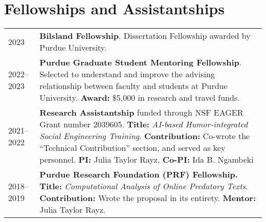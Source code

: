 \documentclass[11pt]{article}
\begin{document}
\section*{Fellowships and Assistantships}
\vspace{-.5em}
\renewcommand*{\arraystretch}{1.5}
\begin{tabularx}{\textwidth}{@{}p{} X}
2023 & \textbf{Bilsland Fellowship}. Dissertation Fellowship awarded by Purdue University.\\
2022--2023 & \textbf{Purdue Graduate Student Mentoring Fellowship}. Selected to understand and improve the advising relationship between faculty and students at Purdue University. \textbf{Award:} \$5{,}000 in research and travel funds.\\
2021--2022 & \textbf{Research Assistantship} funded through NSF EAGER Grant number 2039605. \textbf{Title:} \emph{AI-based Humor-integrated Social Engineering Training}. \textbf{Contribution:} Co-wrote the ``Technical Contribution'' section, and served as key personnel. \textbf{PI:} Julia Taylor Rayz, \textbf{Co-PI:} Ida B. Ngambeki \\
2018--2019 & \textbf{Purdue Research Foundation (PRF) Fellowship.} \textbf{Title:} \textit{Computational Analysis of Online Predatory Texts}. \textbf{Contribution:} Wrote the proposal in its entirety. \textbf{Mentor:} Julia Taylor Rayz.\\
\end{tabularx}

\renewcommand*{\arraystretch}{1}
\end{document}

